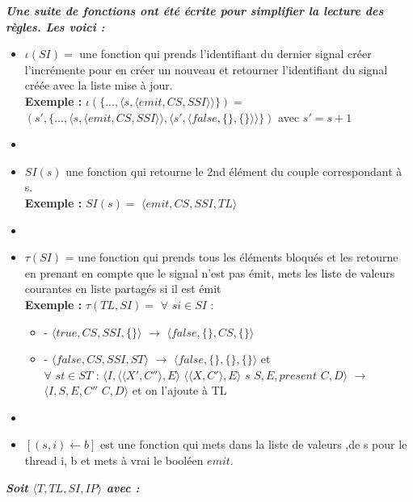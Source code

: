 \documentclass[10pt,a4paper]{article}
\begin{document}
		\textbf{\textit{Une suite de fonctions ont été écrite pour simplifier la lecture des règles. Les voici :}}
		\smallbreak
		\begin{itemize}
			\item[] $\iota(SI) =$ une fonction qui prends l'identifiant du dernier signal créer l'incrémente pour en créer un nouveau et retourner l'identifiant du signal créée avec la liste mise à jour.
			\\ \textbf{Exemple :} $\iota(\{...,\langle s,\langle emit,CS,SSI\rangle\rangle\}) =$ $(s' ,\{...,\langle s,\langle emit,CS,SSI\rangle\rangle,\langle s',\langle false,\{\},\{\}\rangle\rangle\})$ avec $s' = s+1$
			\item[] 
			\item[] $SI(s)$ une fonction qui retourne le 2nd élément du couple correspondant à s.
			\\\textbf{Exemple :} $SI(s) =$ $\langle emit,CS,SSI,TL\rangle$
			\item[]  
			\item[] $\tau(SI)$ = une fonction qui prends tous les éléments bloqués et les retourne en prenant en compte que le signal n'est pas émit, mets les liste de valeurs courantes en liste partagés si il est émit 
			\\ \textbf{Exemple :} $\tau(TL,SI) =$ $\forall$ $si \in SI$ : 
			\begin{itemize}
				\item[] - $\langle true,CS,SSI,\{\}\rangle$ $\rightarrow$ $\langle false,\{\},CS,\{\}\rangle$
				\item[] - $\langle false,CS,SSI,ST\rangle$ $\rightarrow$ $\langle false,\{\},\{\},\{\}\rangle$ et 
				\\$\forall$ $st \in ST$ : $\langle I,\langle\langle X',C''\rangle, E\rangle$ $\langle\langle X,C'\rangle, E\rangle$ $s$ $S,E,present$ $C,D\rangle$ $\rightarrow$ $ \langle I,S,E,C''$ $C,D\rangle$ et on l'ajoute à TL
			\end{itemize}
			\item[]
			\item[] $[(s,i) \leftarrow b]$ est une fonction qui mets dans la liste de valeurs ,de s pour le thread i, b et mets à vrai le booléen $emit$.
		\end{itemize}
		\newpage
		
		\textbf{\textit{Soit $\langle T,TL,SI,IP\rangle$ avec :}}
		
\end{document}
